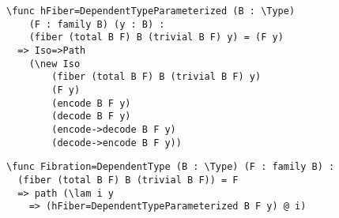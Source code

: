 \begin{ListingEnv}[H]
\begin{lstlisting}
\func hFiber=DependentTypeParameterized (B : \Type) 
	(F : family B) (y : B) : 
	(fiber (total B F) B (trivial B F) y) = (F y)
  => Iso=>Path 
  	(\new Iso 
  		(fiber (total B F) B (trivial B F) y) 
  		(F y) 
  		(encode B F y) 
  		(decode B F y) 
  		(encode->decode B F y) 
  		(decode->encode B F y))
\end{lstlisting}
\end{ListingEnv}

\begin{ListingEnv}[H]
\begin{lstlisting}
\func Fibration=DependentType (B : \Type) (F : family B) : 
  (fiber (total B F) B (trivial B F)) = F
  => path (\lam i y
    => (hFiber=DependentTypeParameterized B F y) @ i)
\end{lstlisting}
\end{ListingEnv}

\Conc

\begin{otherlanguage}{english}
\printbibliography[%
    heading=bibintoc%
    ,title=Bibliography
]
\end{otherlanguage}


